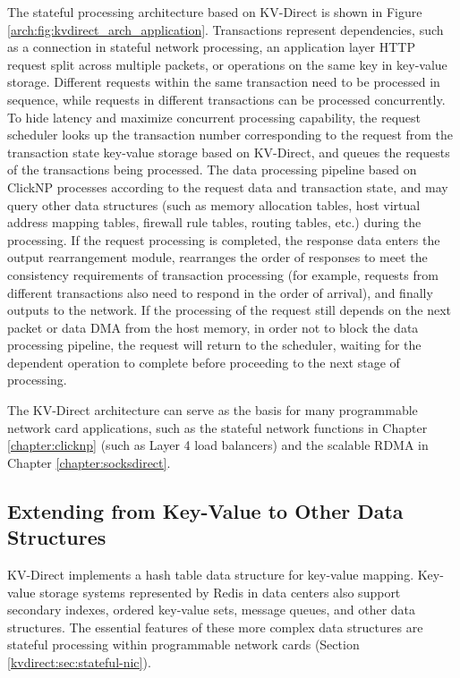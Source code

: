 The stateful processing architecture based on KV-Direct is shown in Figure \ref{arch:fig:kvdirect_arch_application}. Transactions represent dependencies, such as a connection in stateful network processing, an application layer HTTP request split across multiple packets, or operations on the same key in key-value storage. Different requests within the same transaction need to be processed in sequence, while requests in different transactions can be processed concurrently. To hide latency and maximize concurrent processing capability, the request scheduler looks up the transaction number corresponding to the request from the transaction state key-value storage based on KV-Direct, and queues the requests of the transactions being processed. The data processing pipeline based on ClickNP processes according to the request data and transaction state, and may query other data structures (such as memory allocation tables, host virtual address mapping tables, firewall rule tables, routing tables, etc.) during the processing. If the request processing is completed, the response data enters the output rearrangement module, rearranges the order of responses to meet the consistency requirements of transaction processing (for example, requests from different transactions also need to respond in the order of arrival), and finally outputs to the network. If the processing of the request still depends on the next packet or data DMA from the host memory, in order not to block the data processing pipeline, the request will return to the scheduler, waiting for the dependent operation to complete before proceeding to the next stage of processing.

The KV-Direct architecture can serve as the basis for many programmable network card applications, such as the stateful network functions in Chapter \ref{chapter:clicknp} (such as Layer 4 load balancers) and the scalable RDMA in Chapter \ref{chapter:socksdirect}.

\subsection{Extending from Key-Value to Other Data Structures}
\label{kvdirect:sec:data-structure}

KV-Direct implements a hash table data structure for key-value mapping. Key-value storage systems represented by Redis \cite{redis} in data centers also support secondary indexes, ordered key-value sets, message queues, and other data structures. The essential features of these more complex data structures are stateful processing within programmable network cards (Section \ref{kvdirect:sec:stateful-nic}).

